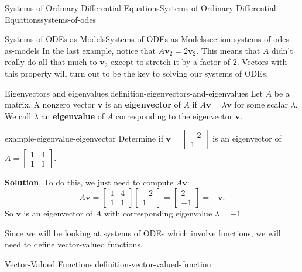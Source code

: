 \documentclass[oneside,10pt,]{book}
\newcommand{\terminology}[1]{\textbf{#1}}
\numberwithin{equation}{section}
\renewcommand{\vec}[1]{\mathbf{#1}}
\newcommand{\amp}{&}
\begin{document}
\begin{chapterptx}{Systems of Ordinary Differential Equations}{}{Systems of Ordinary Differential Equations}{}{}{systems-of-odes}
\begin{sectionptx}{Systems of ODEs as Models}{}{Systems of ODEs as Models}{}{}{section-systems-of-odes-as-models}
\hypertarget{p-310}{}%
In the last example, notice that \(A\vec{v}_{2} = 2\vec{v}_{2}\). This means that \(A\) didn't really do all that much to \(\vec{v}_{2}\) except to stretch it by a factor of \(2\). Vectors with this property will turn out to be the key to solving our systems of ODEs.%
\begin{definition}{Eigenvectors and eigenvalues.}{definition-eigenvectors-and-eigenvalues}%
\hypertarget{p-311}{}%
Let \(A\) be a matrix. A nonzero vector \(\vec{v}\) is an \terminology{eigenvector} of \(A\) if \(A\vec{v} = \lambda\vec{v}\) for some scalar \(\lambda\). We call \(\lambda\) an \terminology{eigenvalue} of \(A\) corresponding to the eigenvector \(\vec{v}\).%
\end{definition}
\begin{example}{}{example-eigenvalue-eigenvector}%
\hypertarget{p-312}{}%
Determine if \(\vec{v} = \begin{bmatrix}-2\\1\end{bmatrix}\) is an eigenvector of \(A = \begin{bmatrix}1\amp4\\1\amp1\end{bmatrix}\).%
\par\smallskip%
\noindent\textbf{Solution}.\hypertarget{solution-48}{}\quad%
\hypertarget{p-313}{}%
To do this, we just need to compute \(A\vec{v}:\)%
\begin{equation*}
A\vec{v} = \begin{bmatrix}1\amp4\\1\amp1\end{bmatrix}\begin{bmatrix}-2\\1\end{bmatrix} = \begin{bmatrix}2\\-1\end{bmatrix} = -\vec{v}.
\end{equation*}
So \(\vec{v}\) is an eigenvector of \(A\) with corresponding eigenvalue \(\lambda=-1\).%
\end{example}
\hypertarget{p-314}{}%
Since we will be looking at systems of ODEs which involve functions, we will need to define vector-valued functions.%
\begin{definition}{Vector-Valued Functions.}{definition-vector-valued-function}%
\hypertarget{p-315}{}%

\end{definition}
\end{sectionptx}
\end{chapterptx}
\end{document}
